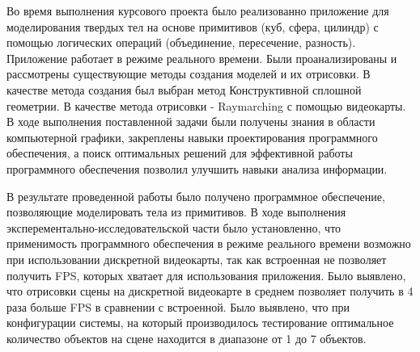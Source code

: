 \Conclusion %
 
Во время выполнения курсового проекта было реализованно приложение для моделирования твердых тел
на основе примитивов (куб, сфера, цилиндр) с помощью
логических операций (объединение, пересечение, разность). Приложение работает в режиме реального времени.
Были проанализированы и рассмотрены существующие методы создания моделей и их отрисовки.
В качестве метода создания был выбран метод Конструктивной сплошной геометрии.
В качестве метода отрисовки - Raymarching с помощью видеокарты.
В ходе выполнения поставленной задачи были получены знания в области компьютерной графики,
закреплены навыки проектирования программного обеспечения, а поиск оптимальных решений для эффективной работы программного обеспечения позволил улучшить навыки анализа информации.
 
В результате проведенной работы было получено программное обеспечение,
позволяющие моделировать тела из примитивов.
В ходе выполнения эксперементально-исследовательской части было
установленно, что применимость программного обеспечения в режиме реального
времени возможно при использовании дискретной видеокарты, так как встроенная
не позволяет получить FPS, которых хватает для использования приложения. Было выявлено,
что отрисовки сцены на дискретной видеокарте в среднем позволяет получить в 4 раза больше
FPS в сравнении с встроенной. Было выявлено, что при конфигурации системы, на который производилось
тестирование оптимальное количество объектов на сцене находится в диапазоне от 1 до 7 объектов.
 
 
 

